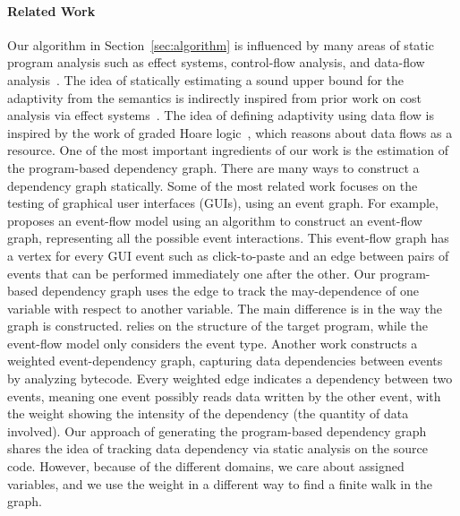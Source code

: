 \paragraph*{Related Work} 
Our algorithm in Section~\ref{sec:algorithm} is influenced by many areas of static program analysis such as effect systems, control-flow analysis, and data-flow analysis~\cite{ryder1988incremental}. The idea of statically estimating a sound upper bound for the adaptivity from the semantics is indirectly inspired from prior work on cost analysis via effect systems~\cite{cciccek2017relational,radivcek2017monadic,qu2019relational}. The idea of defining adaptivity using data flow is inspired by the work of graded 
Hoare logic~\cite{gaboardi2021graded}, which reasons about data flows as a resource. 
%
One of the most important ingredients of our work is the estimation of the program-based dependency graph. 
There are many ways to construct a dependency graph statically.
Some of the most related work focuses on the testing of graphical user interfaces (GUIs), using an event graph. For example, \cite{memon2007event} proposes an event-flow model using an algorithm to construct an event-flow graph, representing all the possible event interactions. This event-flow graph has a vertex for every GUI event such as click-to-paste and an edge between pairs of events that can be performed immediately one after the other. Our program-based dependency graph uses the edge to track the may-dependence of one variable with respect to another variable. The main difference is in the way the graph is constructed. {\THESYSTEM} relies on the structure of the target program, while the event-flow model only considers the event type. Another work \cite{arlt2012lightweight} constructs a weighted event-dependency graph, capturing data dependencies between events by analyzing bytecode. Every weighted edge indicates a dependency between two events, meaning one event possibly reads data written by the other event, with the weight showing the intensity of the dependency (the quantity of data involved). Our approach of generating the program-based dependency graph shares the idea of tracking data dependency via static analysis on the source code. However, because of the different domains, we care about assigned variables, and we use the weight in a different way to find a finite walk in the graph.
